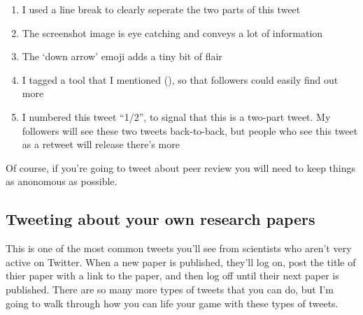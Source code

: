 \documentclass[]{book}
\providecommand{\tightlist}{%
  \setlength{\itemsep}{0pt}\setlength{\parskip}{0pt}}
\begin{document}
\begin{enumerate}
\def\labelenumi{\arabic{enumi}.}
\tightlist
\item
  I used a line break to clearly seperate the two parts of this tweet
\item
  The screenshot image is eye catching and conveys a lot of information
\item
  The `down arrow' emoji adds a tiny bit of flair
\item
  I tagged a tool that I mentioned (\citet{jamovistats}), so that followers could easily find out more
\item
  I numbered this tweet ``1/2'', to signal that this is a two-part tweet. My followers will see these two tweets back-to-back, but people who see this tweet as a retweet will release there's more
\end{enumerate}

Of course, if you're going to tweet about peer review you will need to keep things as anonomous as possible.

\hypertarget{tweeting-about-your-own-research-papers}{%
\subsection{Tweeting about your own research papers}\label{tweeting-about-your-own-research-papers}}

This is one of the most common tweets you'll see from scientists who aren't very active on Twitter. When a new paper is published, they'll log on, post the title of thier paper with a link to the paper, and then log off until their next paper is published. There are so many more types of tweets that you can do, but I'm going to walk through how you can life your game with these types of tweets.
\end{document}
